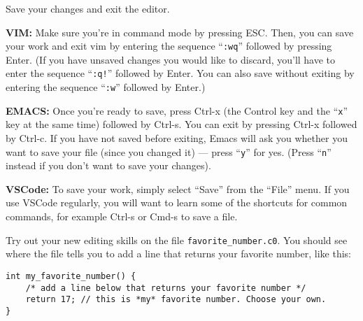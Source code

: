 \begin{part}
  Save your changes and exit the editor.

  \textbf{VIM:} Make sure you're in command mode by pressing ESC\@.
  Then, you can save your work and exit vim by entering the
  sequence ``\lstinline':wq''' followed by pressing Enter.
  (If you have unsaved changes you would like to discard,
  you'll have to enter the sequence ``\lstinline':q!''' followed by Enter.
  You can also save without exiting by entering the sequence
  ``\lstinline':w''' followed by Enter.)

  \textbf{EMACS:} Once you're ready to save, press Ctrl-x (the Control
  key and the ``\lstinline'x''' key at the same time) followed by
  Ctrl-s. You can exit by pressing Ctrl-x followed by Ctrl-c.  If you
  have not saved before exiting, Emacs will ask you whether you want
  to save your file (since you changed it) --- press ``\lstinline'y'''
  for yes. (Press ``\lstinline'n''' instead if you don't want to save
  your changes).

  \textbf{VSCode:} To save your work, simply select ``Save'' from the
  ``File'' menu. If you use VSCode regularly, you will want to learn
  some of the shortcuts for common commands, for example Ctrl-s or Cmd-s
  to save a file.

\end{part}

\begin{part}
Try out your new editing skills on the file \lstinline'favorite_number.c0'.
You should see where the file tells you to add a line that returns your
favorite number, like this:
\begin{lstlisting}[language={[coin]C}, belowskip=0pt]
int my_favorite_number() {
    /* add a line below that returns your favorite number */
    return 17; // this is *my* favorite number. Choose your own.
}
\end{lstlisting}
\end{part}
